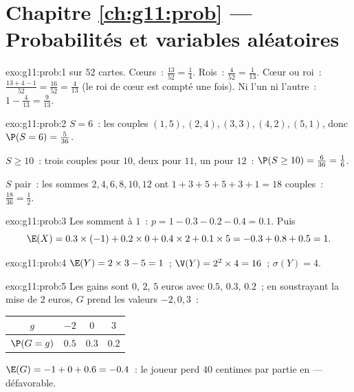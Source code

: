 \section*{Chapitre \ref{ch:g11:prob} --- Probabilités et variables aléatoires}

\begin{solution}{exo:g11:prob:1}
 sur $52$ cartes. Cœurs~: $\frac{13}{52} = \frac14$.
Rois~: $\frac{4}{52} = \frac{1}{13}$. Cœur ou roi~:
$\frac{13 + 4 - 1}{52} = \frac{16}{52} = \frac{4}{13}$ (le roi de cœur
est compté une fois). Ni l'un ni l'autre~: $1 - \frac{4}{13} =
\frac{9}{13}$.
\end{solution}

\begin{solution}{exo:g11:prob:2}
$S = 6$~: les couples $(1,5), (2,4), (3,3), (4,2), (5,1)$, donc
$\P(S = 6) = \frac{5}{36}$.

$S \geq 10$~: trois couples pour $10$, deux pour $11$, un pour $12$~:
$\P(S \geq 10) = \frac{6}{36} = \frac16$.

$S$ pair~: les sommes $2, 4, 6, 8, 10, 12$ ont
$1 + 3 + 5 + 5 + 3 + 1 = 18$ couples~: 
$\frac{18}{36} = \frac12$.
\end{solution}

\begin{solution}{exo:g11:prob:3}
Les  somment à $1$~: $p = 1 - 0.3 - 0.2 - 0.4 = 0.1$. Puis
\[
\E(X) = 0.3 \times (-1) + 0.2 \times 0 + 0.4 \times 2 + 0.1 \times 5
= -0.3 + 0.8 + 0.5 = 1 .
\]
\end{solution}

\begin{solution}{exo:g11:prob:4}
$\E(Y) = 2 \times 3 - 5 = 1$~; $\V(Y) = 2^2 \times 4 = 16$~;
$\sigma(Y) = 4$.
\end{solution}

\begin{solution}{exo:g11:prob:5}
Les gains sont $0$, $2$, $5$ euros avec  $0.5$, $0.3$,
$0.2$~; en soustrayant la mise de $2$ euros, $G$ prend les valeurs
$-2, 0, 3$~:
\begin{center}
\begin{tabular}{c|ccc}
$g$ & $-2$ & $0$ & $3$\\
\hline
$\P(G=g)$ & $0.5$ & $0.3$ & $0.2$
\end{tabular}
\end{center}
$\E(G) = -1 + 0 + 0.6 = -0.4$~: le joueur perd $40$ centimes par partie
en  --- défavorable.
\end{solution}

